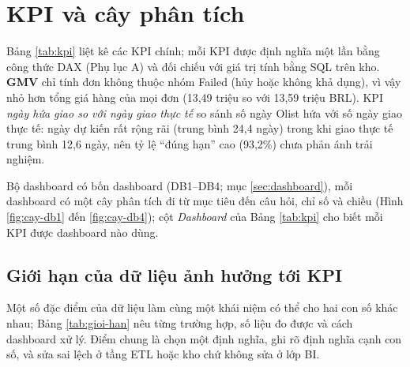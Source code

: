 \section{KPI và cây phân tích}\label{sec:kpi}
Bảng \ref{tab:kpi} liệt kê các KPI chính; mỗi KPI được định nghĩa một lần bằng công thức DAX (Phụ lục A) và đối chiếu với giá trị tính bằng SQL trên kho. \textbf{GMV} chỉ tính đơn không thuộc nhóm Failed (hủy hoặc không khả dụng), vì vậy nhỏ hơn tổng giá hàng của mọi đơn (13,49 triệu so với 13,59 triệu BRL). KPI \emph{ngày hứa giao so với ngày giao thực tế} so sánh số ngày Olist hứa với số ngày giao thực tế: ngày dự kiến rất rộng rãi (trung bình 24,4 ngày) trong khi giao thực tế trung bình 12,6 ngày, nên tỷ lệ ``đúng hạn'' cao (93,2\%) chưa phản ánh trải nghiệm.

Bộ dashboard có bốn dashboard (DB1--DB4; mục \ref{sec:dashboard}), mỗi dashboard có một cây phân tích đi từ mục tiêu đến câu hỏi, chỉ số và chiều (Hình \ref{fig:cay-db1} đến \ref{fig:cay-db4}); cột \emph{Dashboard} của Bảng \ref{tab:kpi} cho biết mỗi KPI được dashboard nào dùng.

\subsection{Giới hạn của dữ liệu ảnh hưởng tới KPI}\label{sec:gioi-han}
Một số đặc điểm của dữ liệu làm cùng một khái niệm có thể cho hai con số khác nhau; Bảng \ref{tab:gioi-han} nêu từng trường hợp, số liệu đo được và cách dashboard xử lý. Điểm chung là chọn một định nghĩa, ghi rõ định nghĩa cạnh con số, và sửa sai lệch ở tầng ETL hoặc kho chứ không sửa ở lớp BI.

